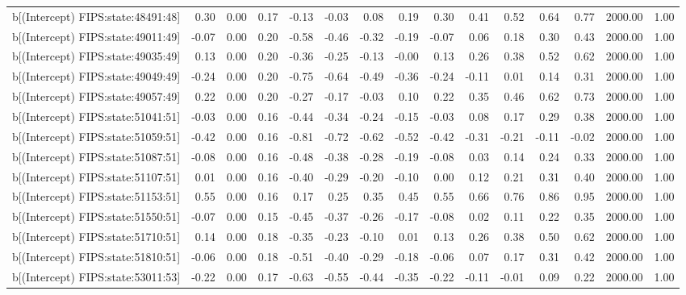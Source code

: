 \begin{table}[ht]
\begin{tabular}{rrrrrrrrrrrrrrr}
  b[(Intercept) FIPS:state:48491:48] & 0.30 & 0.00 & 0.17 & -0.13 & -0.03 & 0.08 & 0.19 & 0.30 & 0.41 & 0.52 & 0.64 & 0.77 & 2000.00 & 1.00 \\ 
  b[(Intercept) FIPS:state:49011:49] & -0.07 & 0.00 & 0.20 & -0.58 & -0.46 & -0.32 & -0.19 & -0.07 & 0.06 & 0.18 & 0.30 & 0.43 & 2000.00 & 1.00 \\ 
  b[(Intercept) FIPS:state:49035:49] & 0.13 & 0.00 & 0.20 & -0.36 & -0.25 & -0.13 & -0.00 & 0.13 & 0.26 & 0.38 & 0.52 & 0.62 & 2000.00 & 1.00 \\ 
  b[(Intercept) FIPS:state:49049:49] & -0.24 & 0.00 & 0.20 & -0.75 & -0.64 & -0.49 & -0.36 & -0.24 & -0.11 & 0.01 & 0.14 & 0.31 & 2000.00 & 1.00 \\ 
  b[(Intercept) FIPS:state:49057:49] & 0.22 & 0.00 & 0.20 & -0.27 & -0.17 & -0.03 & 0.10 & 0.22 & 0.35 & 0.46 & 0.62 & 0.73 & 2000.00 & 1.00 \\ 
  b[(Intercept) FIPS:state:51041:51] & -0.03 & 0.00 & 0.16 & -0.44 & -0.34 & -0.24 & -0.15 & -0.03 & 0.08 & 0.17 & 0.29 & 0.38 & 2000.00 & 1.00 \\ 
  b[(Intercept) FIPS:state:51059:51] & -0.42 & 0.00 & 0.16 & -0.81 & -0.72 & -0.62 & -0.52 & -0.42 & -0.31 & -0.21 & -0.11 & -0.02 & 2000.00 & 1.00 \\ 
  b[(Intercept) FIPS:state:51087:51] & -0.08 & 0.00 & 0.16 & -0.48 & -0.38 & -0.28 & -0.19 & -0.08 & 0.03 & 0.14 & 0.24 & 0.33 & 2000.00 & 1.00 \\ 
  b[(Intercept) FIPS:state:51107:51] & 0.01 & 0.00 & 0.16 & -0.40 & -0.29 & -0.20 & -0.10 & 0.00 & 0.12 & 0.21 & 0.31 & 0.40 & 2000.00 & 1.00 \\ 
  b[(Intercept) FIPS:state:51153:51] & 0.55 & 0.00 & 0.16 & 0.17 & 0.25 & 0.35 & 0.45 & 0.55 & 0.66 & 0.76 & 0.86 & 0.95 & 2000.00 & 1.00 \\ 
  b[(Intercept) FIPS:state:51550:51] & -0.07 & 0.00 & 0.15 & -0.45 & -0.37 & -0.26 & -0.17 & -0.08 & 0.02 & 0.11 & 0.22 & 0.35 & 2000.00 & 1.00 \\ 
  b[(Intercept) FIPS:state:51710:51] & 0.14 & 0.00 & 0.18 & -0.35 & -0.23 & -0.10 & 0.01 & 0.13 & 0.26 & 0.38 & 0.50 & 0.62 & 2000.00 & 1.00 \\ 
  b[(Intercept) FIPS:state:51810:51] & -0.06 & 0.00 & 0.18 & -0.51 & -0.40 & -0.29 & -0.18 & -0.06 & 0.07 & 0.17 & 0.31 & 0.42 & 2000.00 & 1.00 \\ 
  b[(Intercept) FIPS:state:53011:53] & -0.22 & 0.00 & 0.17 & -0.63 & -0.55 & -0.44 & -0.35 & -0.22 & -0.11 & -0.01 & 0.09 & 0.22 & 2000.00 & 1.00 \\ 

\end{tabular}
\end{table}
